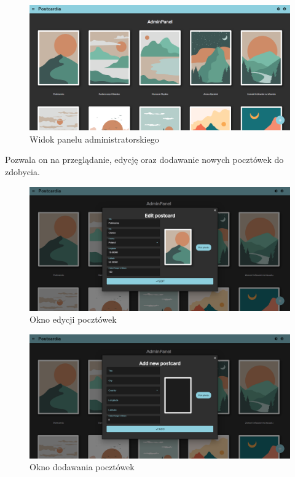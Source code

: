 \documentclass[a4paper,twoside,12pt]{book}
\begin{document}
\begin{figure}[H]
    \centering
    \includegraphics[width=1\textwidth]{webowka_ss/admin_panel.png}
    \caption{Widok panelu administratorskiego}
\end{figure}

Pozwala on na przeglądanie, edycję oraz dodawanie nowych pocztówek do zdobycia.

\begin{figure}[H]
    \centering
    \includegraphics[width=1\textwidth]{webowka_ss/admin_panel_edit.png}
    \caption{Okno edycji pocztówek}
\end{figure}

\begin{figure}[H]
    \centering
    \includegraphics[width=1\textwidth]{webowka_ss/admin_panel_add.png}
    \caption{Okno dodawania pocztówek}
\end{figure}
\end{document}
